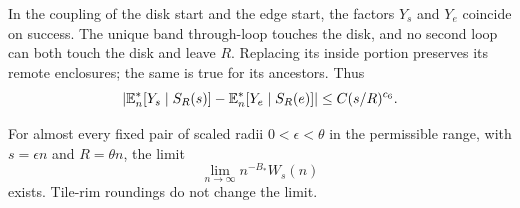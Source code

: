In the coupling of the disk start and the edge start, the factors
$Y_s$ and $Y_e$ coincide on success. The unique band through-loop
touches the disk, and no second loop can both touch the disk and leave
$R$. Replacing its inside portion preserves its remote enclosures;
the same is true for its ancestors. Thus
\begin{equation}\label{eq:disk-signed-comparison}
 \left|\mathbb E_n^*[Y_s\mid S_R(s)]-
             \mathbb E_n^*[Y_e\mid S_R(e)]\right|
 \le C(s/R)^{c_6}.
\end{equation}

\begin{lemma}\label{lem:disk-diagnostic}
For almost every fixed pair of scaled radii $0<\epsilon<\theta$
in the permissible range, with $s=\epsilon n$ and $R=\theta n$,
the limit
\begin{equation}\label{eq:diagnostic-limit}
 \lim_{n\to\infty}n^{-B_*}W_s(n)
\end{equation}
exists. Tile-rim roundings do not change the limit.
\end{lemma}

